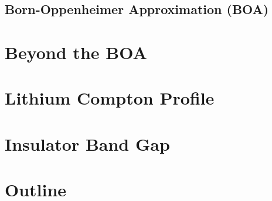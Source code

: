 \subsection{Born-Oppenheimer Approximation (BOA)}
\section{Beyond the BOA}
\section{Lithium Compton Profile}
\section{Insulator Band Gap}
\section{Outline}